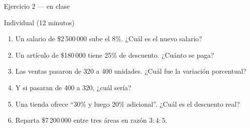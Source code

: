 \documentclass[aspectratio=169,10pt]{beamer}
\begin{document}
\begin{frame}{Ejercicio 2 — en clase}
  \begin{alertblock}{Individual (12 minutos)}
    \scriptsize
    \begin{enumerate}\setlength{\itemsep}{0.06cm}
      \item Un salario de \$2\,500\,000 sube el $8\%$. ¿Cuál es el nuevo
            salario?
      \item Un artículo de \$180\,000 tiene 25\% de descuento. ¿Cuánto se
            paga?
      \item Las ventas pasaron de 320 a 400 unidades. ¿Cuál fue la variación
            porcentual?
      \item Y si pasaran de 400 a 320, ¿cuál sería?
      \item Una tienda ofrece ``30\% y luego 20\% adicional''. ¿Cuál es el
            descuento real?
      \item Reparta \$7\,200\,000 entre tres áreas en razón $3:4:5$.
    \end{enumerate}
  \end{alertblock}
\end{frame}
\end{document}
